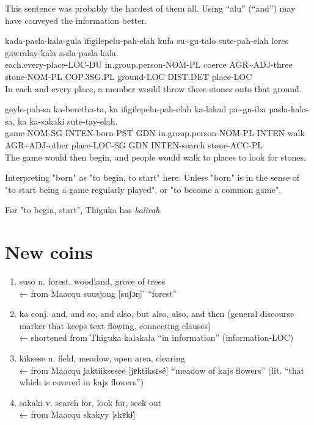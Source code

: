 \documentclass{thiguka}
\begin{document}
This sentence was probably the hardest of them all. Using ``alu'' (``and'') may have conveyed the information better.

\begin{exe}
    \ex{} \gll{}kada-pasla-kala-gula ifigilepelu-pah-elah kufa su\~{}gu-talo sute-pah-elah lores gawralay-kala asila pasla-kala.\\
                each.every-place-LOC-DU in.group.person-NOM-PL coerce AGR\~{}ADJ-three stone-NOM-PL COP.3SG.PL ground-LOC DIST.DET place-LOC\\
          \glt{}In each and every place, a member would throw three stones onto that ground.
\end{exe}

\begin{exe}
    \ex{} \gll{}geyle-pah-sa ka-beretha-ta, ka ifigilepelu-pah-elah ka-lakad pa\~{}gu-iba pasla-kala-sa, ka ka-sakaki sute-tay-elah.\\
                game-NOM-SG INTEN-born-PST GDN in.group.person-NOM-PL INTEN-walk AGR\~{}ADJ-other place-LOC-SG GDN INTEN-search stone-ACC-PL\\
          \glt{}The game would then begin, and people would walk to places to look for stones.
\end{exe}

Interpreting "born" as "to begin, to start" here. Unless "born" is in the sense of "to start being a game regularly played", or "to become a common game".

For "to begin, start", Thiguka has \textit{kalirah}.

\section{New coins}
\begin{enumerate}
    \item suso n. forest, woodland, grove of trees \\ ← from Maacqu suusjong [suʃɔŋ] ́ “forest”
    \item ka conj. and, and so, and also, but also, also, and then (general discourse marker that keeps text flowing, connecting clauses) \\ ← shortened from Thiguka kalakala “in information” (information-LOC)
    \item kiksese n. field, meadow, open area, clearing \\ ← from Maacqu jaktiiksesee [jɐktiksɛsé] “meadow of kajs flowers” (lit. “that which is covered
in kajs flowers”)
    \item sakaki v. search for, look for, seek out \\ ← from Maacqu skakyy [skɐkɨ]́
\end{enumerate}
\end{document}
